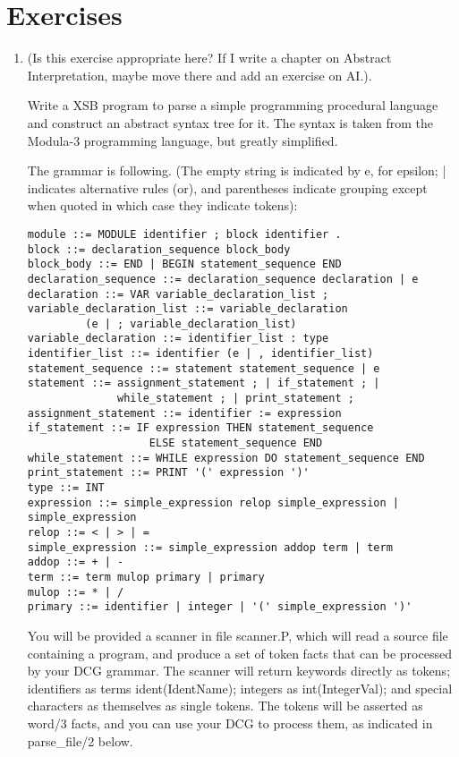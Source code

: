 \section{Exercises}

\begin{enumerate}

\item (Is this exercise appropriate here?  If I write a chapter on Abstract
  Interpretation, maybe move there and add an exercise on AI.).

Write a XSB program to parse a simple
programming procedural language and construct an abstract syntax tree
for it.  The syntax is taken from the Modula-3 programming language,
but greatly simplified.

The grammar is following. (The empty string is indicated by e, for
epsilon; | indicates alternative rules (or), and parentheses indicate
grouping except when quoted in which case they indicate tokens):

\begin{verbatim}
module ::= MODULE identifier ; block identifier .
block ::= declaration_sequence block_body
block_body ::= END | BEGIN statement_sequence END
declaration_sequence ::= declaration_sequence declaration | e
declaration ::= VAR variable_declaration_list ;
variable_declaration_list ::= variable_declaration 
         (e | ; variable_declaration_list)
variable_declaration ::= identifier_list : type
identifier_list ::= identifier (e | , identifier_list)
statement_sequence ::= statement statement_sequence | e
statement ::= assignment_statement ; | if_statement ; |
              while_statement ; | print_statement ;
assignment_statement ::= identifier := expression
if_statement ::= IF expression THEN statement_sequence
                   ELSE statement_sequence END
while_statement ::= WHILE expression DO statement_sequence END
print_statement ::= PRINT '(' expression ')'
type ::= INT
expression ::= simple_expression relop simple_expression | simple_expression
relop ::= < | > | =
simple_expression ::= simple_expression addop term | term
addop ::= + | -
term ::= term mulop primary | primary
mulop ::= * | /
primary ::= identifier | integer | '(' simple_expression ')'
\end{verbatim}

You will be provided a scanner in file scanner.P, which will read
a source file containing a program, and produce a set of token facts
that can be processed by your DCG grammar.  The scanner will return
keywords directly as tokens; identifiers as terms ident(IdentName);
integers as int(IntegerVal); and special characters as themselves as
single tokens.  The tokens will be asserted as word/3 facts, and you
can use your DCG to process them, as indicated in parse\_file/2 below.


\end{enumerate}
